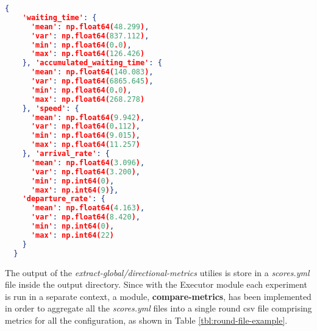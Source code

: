 \noindent
\begin{minipage}{\linewidth}
\begin{lstlisting}[language=JSON, caption=Example of dictionary of metrics extracted from the metric files, label={lst:metrics-global-extraction-example}]
  {
    'waiting_time': {
      'mean': np.float64(48.299),
      'var': np.float64(837.112),
      'min': np.float64(0.0),
      'max': np.float64(126.426)
    }, 'accumulated_waiting_time': {
      'mean': np.float64(140.083),
      'var': np.float64(6865.645),
      'min': np.float64(0.0),
      'max': np.float64(268.278)
    }, 'speed': {
      'mean': np.float64(9.942),
      'var': np.float64(0.112),
      'min': np.float64(9.015),
      'max': np.float64(11.257)
    }, 'arrival_rate': {
      'mean': np.float64(3.096),
      'var': np.float64(3.200),
      'min': np.int64(0),
      'max': np.int64(9)},
    'departure_rate': {
      'mean': np.float64(4.163),
      'var': np.float64(8.420),
      'min': np.int64(0),
      'max': np.int64(22)
    }
  }
\end{lstlisting}
\end{minipage}

The output of the \textit{extract-global/directional-metrics} utilies is store in a \textit{scores.yml} file inside the output directory.
Since with the Executor module each experiment is run in a separate context, a module, \textbf{compare-metrics}, has been implemented in order to aggregate all the \textit{scores.yml} files into a single round csv file comprising metrics for all the configuration, as shown in Table \ref{tbl:round-file-example}.

\begin{table}[H]
  \label{tbl:round-file-example}
\end{table}

